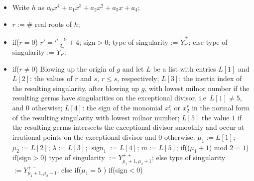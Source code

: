 \documentclass[noend]{amsproc}
\DeclareMathOperator{\sign}{sign}
\begin{document}
\begin{itemize}
\item Write $h$ as $a_0x^4+a_1x^3+a_2x^2+a_3x+a_4$;
\item $r := \#$ real roots of $h$;
\item if($r=0$)\newline
\phantom{}$r'=\frac{\mu-9}{2}+4$;\newline
\phantom\quad sign$>0$;\newline
\phantom{}\quad\quad type of singularity := $\widetilde Y_{r'}^+$;\newline
\phantom{}\quad else\newline
\phantom{}\quad\quad type of singularity := $\widetilde Y_{r'}^-$;
\item if($r\neq 0$)\newline
\phantom{}\quad Blowing up the origin of $g$ and let $L$ be a list with entries
$L[1]$ and $L[2]$: the values of $r$ and $s$, $r\le s$, respectively; $L[3]$:
the inertia index of the resulting singularity, after blowing up $g$, with
lowest milnor number if the resulting germs have singularities on the exceptional divisor, i.e~$L[1]\neq 5$, and $0$ otherwise; $L[4]$: the sign of the monomial
$x_1^r$ or $x_2^r$ in the normal form of the resulting singularity with lowest
milnor number; $L[5]$ the value $1$ if the resulting germs intersects the
exceptional divisor smoothly and occur at irrational points on the exceptional
divisor and $0$ otherwise.\newline
\phantom{}\quad $\mu_1:=L[1]$;\newline
\phantom{}\quad $\mu_2:=L[2]$;\newline
\phantom{}\quad $\lambda:=L[3]$;\newline
\phantom{}\quad $\sign_1:= L[4]$;\newline
\phantom{}\quad $m:=L[5]$;\newline
\phantom{}\quad if(($\mu_1+1$) mod $2=1$)\newline
\phantom{}\quad\quad if(sign$>0$)\newline
\phantom{}\quad\quad\quad type of singularity $:= Y_{\mu_1+1,\mu_2+1}^{++}$;
\newline
\phantom{}\quad\quad else\newline
\phantom{}\quad\quad\quad type of singularity $:=Y_{\mu_1+1,\mu_2+1}^{+-}$;
\newline
\phantom{}\quad else\newline
\phantom{}\quad\quad if($\mu_1=5$ )\newline
\phantom{}\quad\quad\quad\quad if(sign$<0$)\newline

\end{itemize}
\end{document}

